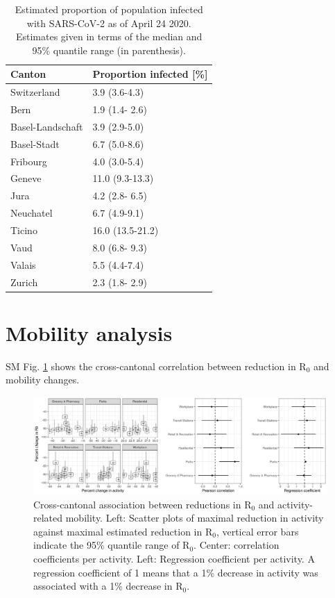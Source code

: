 \begin{table}[]
    \centering
     \caption[Estimated proportion of population infected with SARS-CoV-2 as of April 24 2020]{Estimated proportion of population infected with SARS-CoV-2 as of April 24 2020. Estimates given in terms of the median and 95\% quantile range (in parenthesis).}
\begin{tabular}{ll}
\toprule
Canton & Proportion infected [\%]\\
\midrule
Switzerland & 3.9 (3.6-4.3)\\
Bern & 1.9 (1.4- 2.6)\\
Basel-Landschaft & 3.9 (2.9-5.0)\\
Basel-Stadt & 6.7 (5.0-8.6)\\
Fribourg & 4.0 (3.0-5.4)\\
Geneve & 11.0 (9.3-13.3)\\
Jura & 4.2 (2.8- 6.5)\\
Neuchatel & 6.7 (4.9-9.1)\\
Ticino & 16.0 (13.5-21.2)\\
Vaud & 8.0 (6.8- 9.3)\\
Valais & 5.5 (4.4-7.4)\\
Zurich & 2.3 (1.8- 2.9)\\
\bottomrule
\end{tabular}
    \label{tab:infection}
\end{table}


\section{Mobility analysis}
SM Fig. \ref{fig:mobcorr} shows the cross-cantonal correlation between reduction in R$_0$ and mobility changes.

\begin{figure}[!htb]
    \centering
    \includegraphics[width =\textwidth]{fig_covid-switzerland-npi/fig_supp/mobility_correlation.png}
    \caption[Cross-cantonal association between reductions in R$_0$ and activity-related mobility]{Cross-cantonal association between reductions in R$_0$ and activity-related mobility. Left: Scatter plots of maximal reduction in activity against maximal estimated reduction in R$_0$, vertical error bars indicate the 95\% quantile range of R$_0$. Center: correlation coefficients per activity. Left: Regression coefficient per activity. A regression coefficient of 1 means that a 1\% decrease in activity was associated with a 1\% decrease in R$_0$.}
    \label{fig:mobcorr}
\end{figure}

